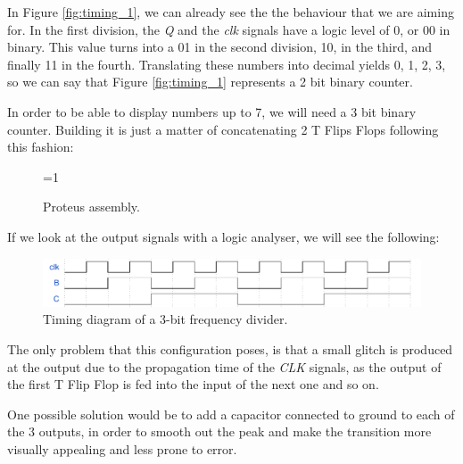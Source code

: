 In Figure \ref{fig:timing_1}, we can already see the the behaviour that we are aiming for. In the first division, the \textit{Q} and the \textit{clk} signals have a logic level of 0, or 00 in binary. This value turns into a 01 in the second division, 10, in the third, and finally 11 in the fourth. Translating these numbers into decimal yields 0, 1, 2, 3, so we can say that Figure \ref{fig:timing_1} represents a 2 bit binary counter.\medskip

In order to be able to display numbers up to 7, we will need a 3 bit binary counter. Building it is just a matter of concatenating 2 T Flips Flops following this fashion:

\begin{figure}[H]
    \centering
    
    \ifnum\value{ANIMATION}=1 {
    } 
    \fi
    
    \caption{Proteus assembly.}
    \label{fig:PROTEUS_7_SEG}
\end{figure}

\clearpage

If we look at the output signals with a logic analyser, we will see the following:\medskip

\begin{figure}[H]
    \centering
    \includegraphics[scale = 0.73]{Graphics/Practice 2/GRAPHICS/TIMING/EX3.pdf}
    \caption{Timing diagram of a 3-bit frequency divider.}
    \label{fig:timing_2}
\end{figure}

The only problem that this configuration poses, is that a small glitch is produced at the output due to the propagation time of the \textit{CLK} signals, as the output of the first T Flip Flop is fed into the input of the next one and so on.\medskip 

One possible solution would be to add a capacitor connected to ground to each of the 3 outputs, in order to smooth out the peak and make the transition more visually appealing and less prone to error.

\clearpage
